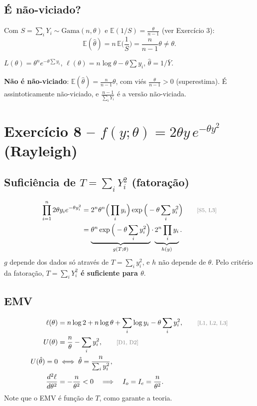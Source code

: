 \documentclass[11pt,a4paper]{article}
\newcommand{\E}{\mathbb{E}}
\newcommand{\bY}{\bar{Y}}
\newcommand{\just}[1]{\tag*{\footnotesize\textcolor{gray}{[#1]}}}
\theoremstyle{definition}
\theoremstyle{plain}
\begin{document}
\subsection*{É não-viciado?}
Com $S=\sum_iY_i\sim\text{Gama}(n,\theta)$ e $\E(1/S)=\frac{\theta}{n-1}$ (ver Exercício 3):
\[
\E(\hat\theta)=n\,\E\Big(\frac1S\Big)=\frac{n}{n-1}\theta\neq\theta .
\]
\begin{resposta}
$L(\theta)=\theta^ne^{-\theta\sum y_i}$, \quad $\ell(\theta)=n\log\theta-\theta\sum y_i$, \quad $\hat\theta=1/\bY$.

\textbf{Não é não-viciado}: $\E(\hat\theta)=\frac{n}{n-1}\theta$, com viés $\frac{\theta}{n-1}>0$ (superestima). É assintoticamente não-viciado, e $\frac{n-1}{\sum_iY_i}$ é a versão não-viciada.
\end{resposta}

\section{Exercício 8 -- $f(y;\theta)=2\theta y\,e^{-\theta y^2}$ (Rayleigh)}

\subsection*{Suficiência de $T=\sum_iY_i^2$ (fatoração)}
\begin{align*}
\prod_{i=1}^n2\theta y_ie^{-\theta y_i^2}
&=2^n\theta^n\Big(\prod_iy_i\Big)\exp\Big(-\theta\sum_iy_i^2\Big) \just{S5, L3}\\
&=\underbrace{\theta^n\exp\Big(-\theta\sum_iy_i^2\Big)}_{g(T;\theta)}\cdot\underbrace{2^n\prod_iy_i}_{h(y)} .
\end{align*}
$g$ depende dos dados só através de $T=\sum_iy_i^2$, e $h$ não depende de $\theta$. Pelo critério da fatoração, \textbf{$T=\sum_iY_i^2$ é suficiente para $\theta$}.

\subsection*{EMV}
\begin{align*}
\ell(\theta)&=n\log2+n\log\theta+\sum_i\log y_i-\theta\sum_iy_i^2, \just{L1, L2, L3}\\
U(\theta)&=\frac n\theta-\sum_iy_i^2, \just{D1, D2}\\
U(\hat\theta)=0&\iff\hat\theta=\frac{n}{\sum_iy_i^2},\\
\frac{d^2\ell}{d\theta^2}&=-\frac{n}{\theta^2}<0\quad\Longrightarrow\quad I_o=I_e=\frac{n}{\theta^2}.
\end{align*}
Note que o EMV é função de $T$, como garante a teoria.
\end{document}
